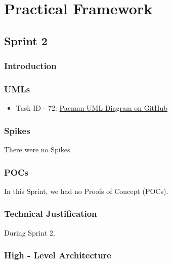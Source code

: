 \section{Practical Framework}


\subsection{Sprint 2}

\subsubsection{Introduction}



\subsubsection{UMLs}



\begin{itemize}
    \item Task ID - 72: \href{https://github.com/Pending-Name-21/arquitecture/pull/11}{Pacman UML Diagram on GitHub}
\end{itemize}

\subsubsection{Spikes}

There were no Spikes

\subsubsection{POCs}

In this Sprint, we had no Proofs of Concept (POCs).

\subsubsection{Technical Justification}

During Sprint 2, 

\subsubsection{High - Level Architecture}

